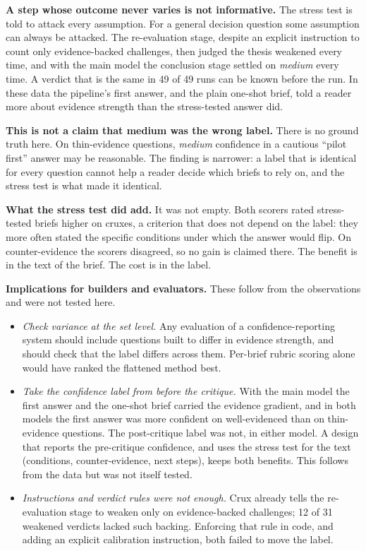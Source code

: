 \documentclass[11pt]{article}
\newcommand{\crux}{Crux}
\begin{document}
\textbf{A step whose outcome never varies is not informative.} The stress test is told to attack every assumption. For a general decision question some assumption can always be attacked. The re-evaluation stage, despite an explicit instruction to count only evidence-backed challenges, then judged the thesis weakened every time, and with the main model the conclusion stage settled on \emph{medium} every time. A verdict that is the same in 49 of 49 runs can be known before the run. In these data the pipeline's first answer, and the plain one-shot brief, told a reader more about evidence strength than the stress-tested answer did.

\textbf{This is not a claim that medium was the wrong label.} There is no ground truth here. On thin-evidence questions, \emph{medium} confidence in a cautious ``pilot first'' answer may be reasonable. The finding is narrower: a label that is identical for every question cannot help a reader decide which briefs to rely on, and the stress test is what made it identical.

\textbf{What the stress test did add.} It was not empty. Both scorers rated stress-tested briefs higher on cruxes, a criterion that does not depend on the label: they more often stated the specific conditions under which the answer would flip. On counter-evidence the scorers disagreed, so no gain is claimed there. The benefit is in the text of the brief. The cost is in the label.

\textbf{Implications for builders and evaluators.} These follow from the observations and were not tested here.
\begin{itemize}
\item \emph{Check variance at the set level.} Any evaluation of a confidence-reporting system should include questions built to differ in evidence strength, and should check that the label differs across them. Per-brief rubric scoring alone would have ranked the flattened method best.
\item \emph{Take the confidence label from before the critique.} With the main model the first answer and the one-shot brief carried the evidence gradient, and in both models the first answer was more confident on well-evidenced than on thin-evidence questions. The post-critique label was not, in either model. A design that reports the pre-critique confidence, and uses the stress test for the text (conditions, counter-evidence, next steps), keeps both benefits. This follows from the data but was not itself tested.
\item \emph{Instructions and verdict rules were not enough.} \crux{} already tells the re-evaluation stage to weaken only on evidence-backed challenges; 12 of 31 weakened verdicts lacked such backing. Enforcing that rule in code, and adding an explicit calibration instruction, both failed to move the label.
\end{itemize}
\end{document}
